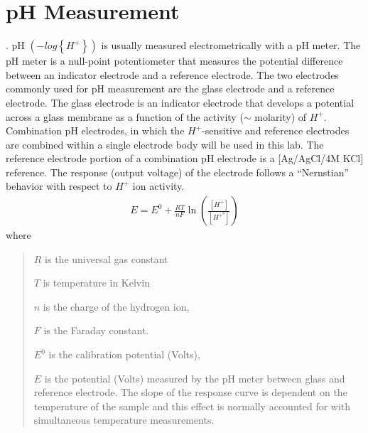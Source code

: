\documentclass[letterpaper,10pt,english]{sphinxmanual}
\begin{document}
\section{pH Measurement}
\label{\detokenize{Acid_Rain/Acid_Rain:ph-measurement}}\label{\detokenize{Acid_Rain/Acid_Rain:heading-acid-rain-ph-measurement}}
. pH \(\left(-log \left\{ H^+ \right\} \right)\) is usually measured electrometrically with a pH meter. The pH meter is a null-point potentiometer that measures the potential difference between an indicator electrode and a reference electrode. The two electrodes commonly used for pH measurement are the glass electrode and a reference electrode. The glass electrode is an indicator electrode that develops a potential across a glass membrane as a function of the activity (\(\mathrm{\sim}\) molarity) of \(H^+\). Combination pH electrodes, in which the \(H^+\)-sensitive and reference electrodes are combined within a single electrode body will be used in this lab. The reference electrode portion of a combination pH electrode is a {[}Ag/AgCl/4M KCl{]} reference. The response (output voltage) of the electrode follows a “Nernstian” behavior with respect to \(H^+\) ion activity.
\begin{equation}\label{equation:Acid_Rain/Acid_Rain:Acid_Rain/Acid_Rain:11}
\begin{split}E=E^{0} +\frac{RT}{nF} \ln \left(\frac{\left[H^{+} \right]}{\left[H^{+^{0} } \right]} \right)\end{split}
\end{equation}
where
\begin{quote}

\begin{DUlineblock}{0em}
\item[] \(R\) is the universal gas constant
\item[] \(T\) is temperature in Kelvin
\item[] \(n\) is the charge of the hydrogen ion,
\item[] \(F\) is the Faraday constant.
\item[] \(E^0\) is the calibration potential (Volts),
\item[] \(E\) is the potential (Volts) measured by the pH meter between glass and reference electrode. The slope of the response curve is dependent on the temperature of the sample and this effect is normally accounted for with simultaneous temperature measurements.
\end{DUlineblock}
\end{quote}
\end{document}
